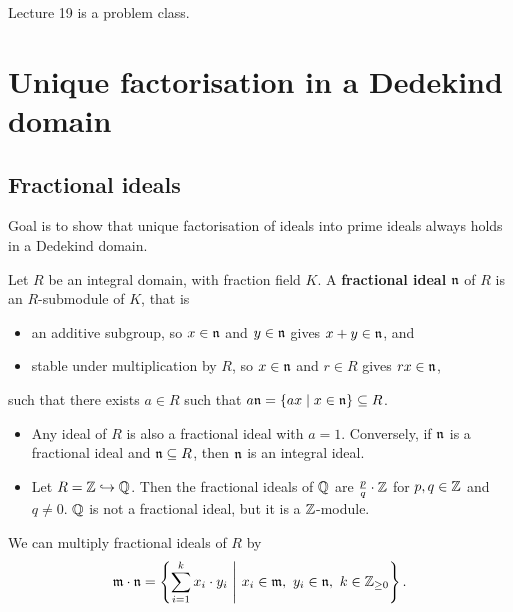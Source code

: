 
Lecture 19 is a problem class.

\pagebreak

\section{Unique factorisation in a Dedekind domain}


\subsection{Fractional ideals}

Goal is to show that unique factorisation of ideals into prime ideals always holds in a Dedekind domain.

\begin{definition}
Let $ R $ be an integral domain, with fraction field $ K $. A \textbf{fractional ideal} $ \mathfrak{n} $ of $ R $ is an $ R $-submodule of $ K $, that is
\begin{itemize}
\item an additive subgroup, so $ x \in \mathfrak{n} $ and $ y \in \mathfrak{n} $ gives $ x + y \in \mathfrak{n} $, and
\item stable under multiplication by $ R $, so $ x \in \mathfrak{n} $ and $ r \in R $ gives $ rx \in \mathfrak{n} $,
\end{itemize}
such that there exists $ a \in R $ such that $ a\mathfrak{n} = \left\{ ax \mid x \in \mathfrak{n} \right\} \subseteq R $.
\end{definition}

\begin{example*}
\hfill
\begin{itemize}
\item Any ideal of $ R $ is also a fractional ideal with $ a = 1 $. Conversely, if $ \mathfrak{n} $ is a fractional ideal and $ \mathfrak{n} \subseteq R $, then $ \mathfrak{n} $ is an integral ideal.
\item Let $ R = \mathbb{Z} \hookrightarrow \mathbb{Q} $. Then the fractional ideals of $ \mathbb{Q} $ are $ \tfrac{p}{q} \cdot \mathbb{Z} $ for $ p, q \in \mathbb{Z} $ and $ q \ne 0 $. $ \mathbb{Q} $ is not a fractional ideal, but it is a $ \mathbb{Z} $-module.
\end{itemize}
\end{example*}

We can multiply fractional ideals of $ R $ by
$$ \mathfrak{m} \cdot \mathfrak{n} = \left\{ \sum_{i = 1}^k x_i \cdot y_i \ \Bigg| \ x_i \in \mathfrak{m}, \ y_i \in \mathfrak{n}, \ k \in \mathbb{Z}_{\ge 0} \right\}. $$

